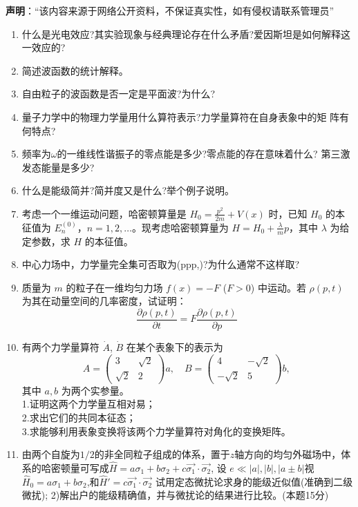 
\textbf{声明}：“该内容来源于网络公开资料，不保证真实性，如有侵权请联系管理员”


\begin{enumerate}
\item 什么是光电效应?其实验现象与经典理论存在什么矛盾?爱因斯坦是如何解释这一效应的?
\item 简述波函数的统计解释。
\item 自由粒子的波函数是否一定是平面波?为什么?
\item 量子力学中的物理力学量用什么算符表示?力学量算符在自身表象中的矩
阵有何特点?
\item 频率为$\omega$的一维线性谐振子的零点能是多少?零点能的存在意味着什么?
第三激发态能量是多少?
\item 什么是能级简并?简并度又是什么?举个例子说明。
\item 考虑一个一维运动问题，哈密顿算量是 $H_0 = \frac{p^2}{2m} + V(x)$ 时，已知 $H_0$ 的本征值为 $E_n^{(0)}$，$n = 1, 2, \dots$。现考虑哈密顿算量为 $H = H_0 + \frac{\lambda}{m} p$，其中 $\lambda$ 为给定参数，求 $H$ 的本征值。
\item 中心力场中，力学量完全集可否取为(ppp,)?为什么通常不这样取?
\item 质量为 $m$ 的粒子在一维均匀力场 $f(x) = -F$ ($F > 0$) 中运动。若 $\rho(p, t)$ 为其在动量空间的几率密度，试证明：
$$\frac{\partial \rho(p, t)}{\partial t} = F \frac{\partial \rho(p, t)}{\partial p}~$$
\item 有两个力学量算符 $\dot A$, $\dot B$ 在某个表象下的表示为
$$A = \begin{pmatrix}3 & \sqrt{2} \\\sqrt{2} & 2\end{pmatrix} a, \quad B = \begin{pmatrix}4 & -\sqrt{2} \\-\sqrt{2} & 5\end{pmatrix} b,~$$
其中 $a, b$ 为两个实参量。\\
1.证明这两个力学量互相对易；\\
2.求出它们的共同本征态；\\
3.求能够利用表象变换将该两个力学量算符对角化的变换矩阵。\\
\item 由两个自旋为$1/2$的非全同粒子组成的体系，置于$z$轴方向的均匀外磁场中，体系的哈密顿量可写成$\hat{H} = a\sigma_1 + b\sigma_2 + c\vec{\sigma_1} \cdot \vec{\sigma_2}$, 设 $e \ll |a|, |b|, |a \pm b|$视$\hat{H}_0 = a\sigma_1 + b\sigma_2$,和$\hat{H}' = c\vec{\sigma_1} \cdot \vec{\sigma_2}$
试用定态微扰论求身的能级近似值(准确到二级微扰);
2)解出户的能级精确值，并与微扰论的结果进行比较。(本题15分)

\end{enumerate}
